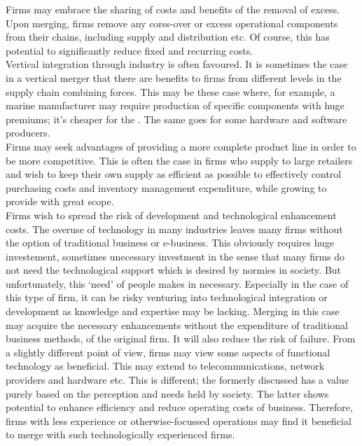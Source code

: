 \documentclass[11pt, english]{article}
\begin{document}
	Firms may embrace the sharing of costs and benefits of the removal of excess. Upon merging, firms remove any corss-over or excess operational components from their chains, including supply and distribution etc. Of course, this has potential to significantly reduce fixed and recurring costs.\\

	Vertical integration through industry is often favoured. It is sometimes the case in a vertical merger that there are benefits to firms from different levels in the supply chain combining forces. This may be these case where, for example, a marine manufacturer may require production of specific components with huge premiums; it's cheaper for the . The same goes for some hardware and software producers.\\

	Firms may seek advantages of providing a more complete product line in order to be more competitive. This is often the case in firms who supply to large retailers and wish to keep their own supply as efficient as possible to effectively control purchasing costs and inventory management expenditure, while growing to provide with great scope.\\

	Firms wish to spread the risk of development and technological enhancement costs. The overuse of technology in many industries leaves many firms without the option of traditional business or e-business. This obviously requires huge investement, sometimes unecessary investment in the sense that many firms do not need the technological support which is desired by normies in society. But unfortunately, this `need' of people makes in necessary. Especially in the case of this type of firm, it can be risky venturing into technological integration or development as knowledge and expertise may be lacking. Merging in this case may acquire the necessary enhancements without the expenditure of traditional business methods, of the original firm. It will also reduce the risk of failure. From a slightly different point of view, firms may view some aspects of functional technology as beneficial. This may extend to telecommunications, network providers and hardware etc. This is different; the formerly discussed has a value purely based on the perception and needs held by society. The latter shows potential to enhance efficiency and reduce operating costs of business. Therefore, firms with less experience or otherwise-focussed operations may find it beneficial to merge with such technologically experienced firms.\\
\end{document}

